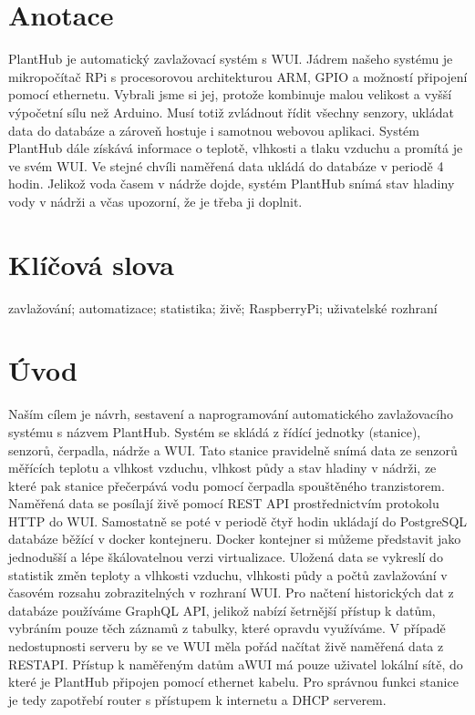 \documentclass[12pt,a4paper]{article}
\begin{document}
\clearpage

\section*{Anotace}

PlantHub je automatický zavlažovací systém s \ac{WUI}. Jádrem našeho systému je mikropočítač \ac{RPi} s procesorovou architekturou \ac{ARM}, \ac{GPIO} a možností připojení pomocí ethernetu. Vybrali jsme si jej, protože kombinuje malou velikost a vyšší výpočetní sílu než Arduino. Musí totiž zvládnout řídit všechny senzory, ukládat data do databáze a zároveň hostuje i samotnou webovou aplikaci. Systém PlantHub dále získává informace o teplotě, vlhkosti a tlaku vzduchu a promítá je ve svém \ac{WUI}. Ve stejné chvíli naměřená data ukládá do databáze v periodě 4 hodin. Jelikož voda časem v nádrže dojde, systém PlantHub snímá stav hladiny vody v nádrži a včas upozorní, že je třeba ji doplnit.

\section*{Klíčová slova}

zavlažování; automatizace; statistika; živě; RaspberryPi; uživatelské rozhraní

\clearpage

\tableofcontents

\clearpage

\section{Úvod}


Naším cílem je návrh, sestavení a naprogramování automatického zavlažovacího systému s názvem PlantHub. Systém se skládá z řídící jednotky (stanice), senzorů, čerpadla, nádrže a \ac{WUI}. Tato stanice pravidelně snímá data ze senzorů měřících teplotu a vlhkost vzduchu, vlhkost půdy a stav hladiny v nádrži, ze které pak stanice přečerpává vodu pomocí čerpadla spouštěného tranzistorem. Naměřená data se posílají živě pomocí \ac{REST} \ac{API} prostřednictvím protokolu HTTP do \ac{WUI}. Samostatně se poté v periodě čtyř hodin ukládají do PostgreSQL databáze běžící v docker kontejneru. Docker kontejner si můžeme představit jako jednodušší a lépe škálovatelnou verzi virtualizace. Uložená data se vykreslí do statistik změn teploty a vlhkosti vzduchu, vlhkosti půdy a počtů zavlažování v časovém rozsahu zobrazitelných v rozhraní \ac{WUI}. Pro načtení historických dat z databáze používáme \ac{GraphQL} \ac{API}, jelikož nabízí šetrnější přístup k datům, vybráním pouze těch záznamů z tabulky, které opravdu využíváme. V případě nedostupnosti serveru by se ve \ac{WUI} měla pořád načítat živě naměřená data z \ac{REST}\ac{API}. Přístup k naměřeným datům a\ac{WUI} má pouze uživatel lokální sítě, do které je PlantHub připojen pomocí ethernet kabelu. Pro správnou funkci stanice je tedy zapotřebí router s přístupem k internetu a DHCP serverem.
\end{document}
